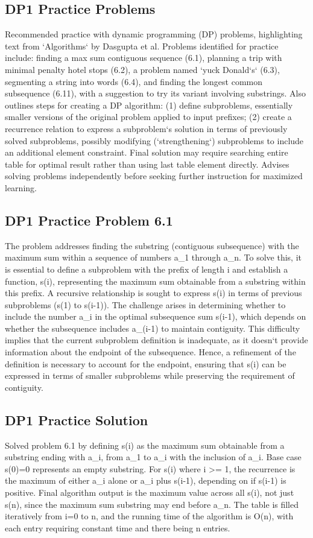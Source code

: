 \subsection*{DP1  Practice Problems}
Recommended practice with dynamic programming (DP) problems, highlighting text from `Algorithms` by Dasgupta et al.
Problems identified for practice include: finding a max sum contiguous sequence (6.1), planning a trip with minimal penalty hotel stops (6.2), a problem named `yuck Donald`s` (6.3), segmenting a string into words (6.4), and finding the longest common subsequence (6.11), with a suggestion to try its variant involving substrings.
Also outlines steps for creating a DP algorithm: (1) define subproblems, essentially smaller versions of the original problem applied to input prefixes; (2) create a recurrence relation to express a subproblem`s solution in terms of previously solved subproblems, possibly modifying (`strengthening`) subproblems to include an additional element constraint.
Final solution may require searching entire table for optimal result rather than using last table element directly.
Advises solving problems independently before seeking further instruction for maximized learning.

\subsection*{DP1  Practice Problem 6.1}
The problem addresses finding the substring (contiguous subsequence) with the maximum sum within a sequence of numbers a\_1 through a\_n.
To solve this, it is essential to define a subproblem with the prefix of length i and establish a function, s(i), representing the maximum sum obtainable from a substring within this prefix.
A recursive relationship is sought to express s(i) in terms of previous subproblems (s(1) to s(i-1)).
The challenge arises in determining whether to include the number a\_i in the optimal subsequence sum s(i-1), which depends on whether the subsequence includes a\_(i-1) to maintain contiguity.
This difficulty implies that the current subproblem definition is inadequate, as it doesn`t provide information about the endpoint of the subsequence.
Hence, a refinement of the definition is necessary to account for the endpoint, ensuring that s(i) can be expressed in terms of smaller subproblems while preserving the requirement of contiguity.

\subsection*{DP1  Practice Solution}
Solved problem 6.1 by defining s(i) as the maximum sum obtainable from a substring ending with a\_i, from a\_1 to a\_i with the inclusion of a\_i.
Base case s(0)=0 represents an empty substring.
For s(i) where i \textgreater{}= 1, the recurrence is the maximum of either a\_i alone or a\_i plus s(i-1), depending on if s(i-1) is positive.
Final algorithm output is the maximum value across all s(i), not just s(n), since the maximum sum substring may end before a\_n.
The table is filled iteratively from i=0 to n, and the running time of the algorithm is O(n), with each entry requiring constant time and there being n entries.


